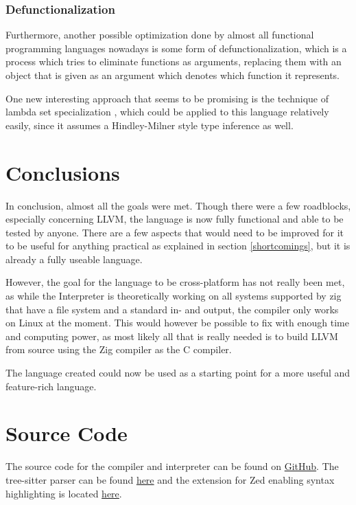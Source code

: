 \documentclass[12pt]{article}
\begin{document}
\subsubsection{Defunctionalization}
Furthermore, another possible optimization done by almost all
functional programming languages nowadays is some form of
defunctionalization, which is a process which tries
to eliminate functions as arguments, replacing them with
an object that is given as an argument which denotes which
function it represents.

One new interesting approach that seems to be promising
is the technique of lambda set specialization
\autocite{brandonBetterDefunctionalizationLambda2023a}, which
could be applied to this language relatively easily,
since it assumes a Hindley-Milner style type inference
as well.

\section{Conclusions}
In conclusion, almost all the goals were met.
Though there were a few roadblocks, especially concerning LLVM,
the language is now fully functional and able to be tested by anyone.
There are a few aspects that would need to be improved for it to be
useful for anything practical as explained in section \ref{shortcomings},
but it is already a fully useable language.

However, the goal for the language to be cross-platform has not really been met,
as while the Interpreter is theoretically working on all systems supported by zig
that have a file system and a standard in- and output, the compiler only works on
Linux at the moment. This would however be possible to fix with enough time and
computing power, as most likely all that is really needed is to build LLVM from
source using the Zig compiler as the C compiler.

The language created could now be used as a starting point for a more useful and
feature-rich language.

\newpage
\printbibliography

\lstlistoflistings

\appendix
\section{Source Code}
The source code for the compiler and interpreter can be found on
\href{https://github.com/enmiligi/matura-project}{GitHub}.
The tree-sitter parser can be found \href{https://github.com/enmiligi/tree-sitter-imp}{here}
and the extension for Zed enabling syntax highlighting is located \href{https://github.com/enmiligi/zed-imp}{here}.
\end{document}
